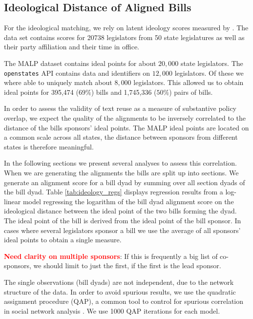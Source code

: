 \documentclass[12pt]{article} %
\begin{document}
\subsection{Ideological Distance of Aligned Bills}



For the ideological matching, we rely on latent ideology scores measured by \citep{shor2011}. The data set contains scores for 20738 legislators from 50 state legislatures as well as their party affiliation and their time in office. 

The MALP dataset contains ideal points for about $20,000$ state legislators. The \texttt{openstates} API contains data and identifiers on $12,000$ legislators. Of these we where able to uniquely match about $8,000$ legislators. This allowed us to obtain ideal points for 395,474 ($69\%$) bills and 1,745,336 ($50\%$) pairs of bills. 

In order to assess the validity of text reuse as a measure of substantive policy overlap, we expect the quality of the alignments to be inversely correlated to the distance of the bills sponsors' ideal points. The MALP ideal points are located on a common scale across all states, the distance between sponsors from different states is therefore meaningful. 

In the following sections we present several analyses to assess this correlation. When we are generating the alignments the bills are split up into sections. We generate an alignment score for a bill dyad by summing over all section dyads of the bill dyad.  Table \ref{tab:ideology_regs} displays regression results from a log-linear model regressing the logarithm of the bill dyad alignment score on the ideological distance between the ideal point of the two bills forming the dyad. The ideal point of the bill is derived from the ideal point of the bill sponsor. In cases where several legislators sponsor a bill we use the average of all sponsors' ideal points to obtain a single measure.


{\bf \textcolor{red}{Need clarity on multiple sponsors}}: If this is frequently a big list of co-sponsors, we should limit to just the first, if the first is the lead sponsor.


The single observations (bill dyads) are not independent, due to the network structure of the data. In order to avoid spurious results, we use the quadratic assignment procedure (QAP), a common tool to control for spurious correlation in social network analysis \citet{krackardt1987qap}. We use 1000 QAP iterations for each model.
\end{document}
